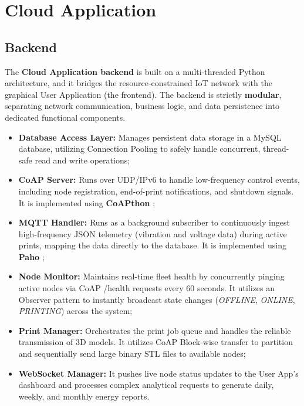 \newpage

\section{Cloud Application}
\subsection{Backend}
The \textbf{Cloud Application backend} is built on a multi-threaded Python architecture, and it bridges the resource-constrained IoT network with the graphical User Application (the frontend). The backend is strictly \textbf{modular}, separating network communication, business logic, and data persistence into dedicated functional components. 
\begin{itemize}
	\item \textbf{Database Access Layer:} Manages persistent data storage in a MySQL database, utilizing Connection Pooling to safely handle concurrent, thread-safe read and write operations;
	\item \textbf{CoAP Server:} Runs over UDP/IPv6 to handle low-frequency control events, including node registration, end-of-print notifications, and shutdown signals. It is implemented using \textbf{CoAPthon} \cite{coapthon};
	\item \textbf{MQTT Handler:} Runs as a background subscriber to continuously ingest high-frequency JSON telemetry (vibration and voltage data) during active prints, mapping the data directly to the database. It is implemented using \textbf{Paho} \cite{paho}; 
	\item \textbf{Node Monitor:} Maintains real-time fleet health by concurrently pinging active nodes via CoAP /health requests every 60 seconds. It utilizes an Observer pattern to instantly broadcast state changes (\textit{OFFLINE}, \textit{ONLINE}, \textit{PRINTING}) across the system;
	\item \textbf{Print Manager:} Orchestrates the print job queue and handles the reliable transmission of 3D models. It utilizes CoAP Block-wise transfer to partition and sequentially send large binary STL files to available nodes;
	\item \textbf{WebSocket Manager:} It pushes live node status updates to the User App's dashboard and processes complex analytical requests to generate daily, weekly, and monthly energy reports.
\end{itemize}

